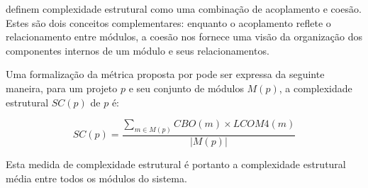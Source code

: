  definem complexidade estrutural como uma combinação de
acoplamento e coesão. Estes são dois conceitos complementares: enquanto o
acoplamento reflete o relacionamento entre módulos, a coesão nos fornece uma
visão da organização dos componentes internos de um módulo e seus
relacionamentos.

Uma formalização da métrica proposta por  pode ser
expressa da seguinte maneira, para um projeto $p$ e seu conjunto de módulos
$M(p)$, a complexidade estrutural $SC(p)$ de $p$ é:

\begin{equation}
SC(p) = \frac
{ \displaystyle \sum_{m \in M(p)} CBO(m) \times LCOM4(m) }
{ |M(p)| }
\end{equation}

Esta medida de complexidade estrutural é portanto a complexidade
estrutural média entre todos os módulos do sistema.

